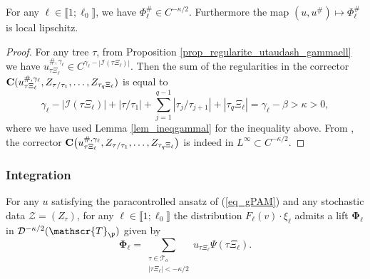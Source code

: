 \documentclass[11pt]{preprint}
\newcommand{\mcI}{\mathcal{I}}
\newcommand{\mcD}{\mathcal{D}}
\newcommand{\mcZ}{\mathcal{Z}}
\newcommand{\mcT}{\mathcal{T}}
\def\eqref#1{(\ref{#1})}
\newcommand{\scrT}{\mathscr{T}}
\newcommand{\bbrack}[1]{ \llbracket #1 \rrbracket }
\begin{document}
	
	
	\begin{proposition}
		For any $\ell\in\bbrack{1;\ell_0}$, we have $\Phi_\ell^\# \in C^{-\kappa/2}$.
		Furthermore the map $(u,u^\#)\mapsto \Phi_\ell^\#$ is local lipschitz.
	\end{proposition}
	
	\begin{proof}
		For any tree $\tau$, from Proposition \ref{prop_regularite_utaudash_gammaell} we have $u_{\tau\Xi_\ell}^{\#,\gamma_\ell} \in C^{\gamma_\ell-|\mcI(\tau\Xi_\ell)|}.$ Then the sum of the regularities in the corrector ${\bf C} (u^{\#,\gamma_\ell}_{\tau\Xi_\ell},Z_{\tau/\tau_1}, \dots, Z_{\tau_q\Xi_\ell})$ is equal to 
		$$
		\gamma_\ell-|\mcI(\tau\Xi_\ell)| +|\tau/\tau_1|+\sum_{j=1}^{q-1} |\tau_j/\tau_{j+1}| + |\tau_q\Xi_\ell| = \gamma_\ell-\beta  >\kappa>0,
		$$ 
		where we have used Lemma \ref{lem_ineqgammal} for the inequality above. From \cite[Theorem 1]{LocalExpansionsParacSystems}, the corrector ${\bf C} \big(u^{\#,\gamma_\ell}_{\tau\Xi_\ell},Z_{\tau/\tau_1}, \dots, Z_{\tau_q\Xi_\ell}\big)$ is indeed in $L^\infty \subset C^{-\kappa/2}$.
		
	\end{proof}
	
	
	
	
	\subsubsection{Integration} \label{subsection_integration}
	
	\begin{lemma}
		For any $u$ satisfying the paracontrolled ansatz of \eqref{eq_gPAM} and any stochastic data $\mcZ=(Z_\tau)$, for any $\ell\in\bbrack{1;\ell_0}$ the distribution $F_\ell(v)\cdot \xi_\ell$ admits a lift $\boldsymbol{\Phi}_{\ell}$ in $\mcD^{-\kappa/2 }(\scrT_\P)$ given by 
		$$
		\boldsymbol{\Phi}_{\ell}= \sum_{\substack{\tau\in\mcT_o \\ |\tau\Xi_\ell|<-\kappa/2}} u_{\tau\Xi_\ell} \Psi(\tau\Xi_\ell). %
		$$
	\end{lemma}
	
\end{document}
